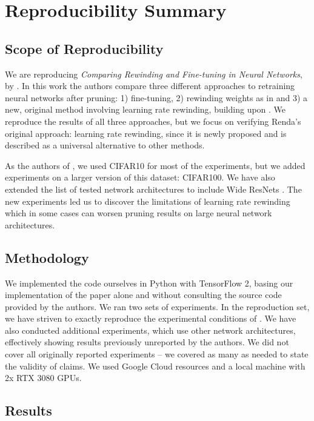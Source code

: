 \section{Reproducibility Summary}

\subsection*{Scope of Reproducibility}
    
We are reproducing \emph{Comparing Rewinding and Fine-tuning in Neural Networks}, by \cite{Renda}.
In this work the authors compare three different approaches to retraining neural networks after pruning: 1) fine-tuning, 2) rewinding weights as in \cite{Frankle} and 3) a new, original method involving learning rate rewinding, building upon \cite{Frankle}. We reproduce the results of all three approaches, but we focus on verifying Renda's original approach: learning rate rewinding, since it is newly proposed and is described as a universal alternative to other methods.

As the authors of \cite {Renda}, we used CIFAR10 for most of the experiments, but we added experiments on a larger version of this dataset: CIFAR100. We have also extended the list of tested network architectures to include Wide ResNets \cite{wrn}. The new experiments led us to discover the limitations of learning rate rewinding which in some cases can worsen pruning results on large neural network architectures.

\subsection*{Methodology}

We implemented the code ourselves in Python with TensorFlow 2, basing our implementation of the paper alone and without consulting the source code provided by the authors. We ran two sets of experiments. In the reproduction set, we have striven to exactly reproduce the experimental conditions of \cite{Renda}. We have also conducted additional experiments, which use other network architectures, effectively showing results previously unreported by the authors. We did not cover all originally reported experiments -- we covered as many as needed to state the validity of claims. We used Google Cloud resources and a local machine with 2x RTX 3080 GPUs.

\subsection*{Results}

